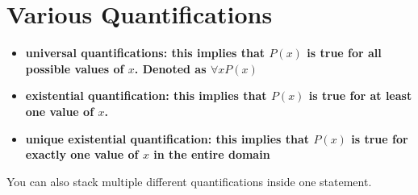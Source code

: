 \section{Various Quantifications}

\begin{itemize}
    \item \bf{universal quantifications:} this implies that $P(x)$ is true for all possible values of $x$. Denoted as $\forall x P(x)$
    \item \bf{existential quantification:} this implies that $P(x)$ is true for at least one value of $x$. 
    \item \bf{unique existential quantification:} this implies that $P(x)$ is true for exactly one value of $x$ in the entire domain
\end{itemize}

You can also stack multiple different quantifications inside one statement.